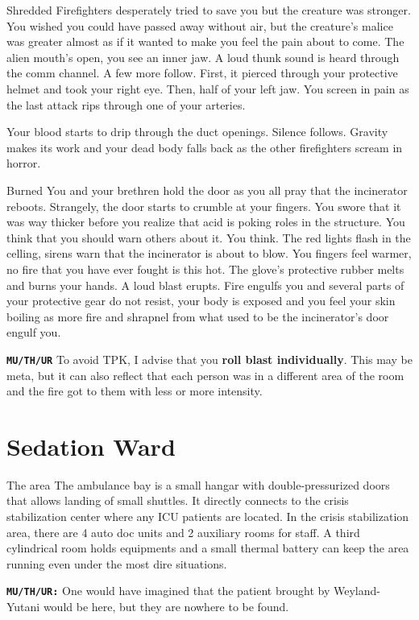 \begin{rpg-warnbox}{Shredded}
   Firefighters desperately tried to save you but the creature was stronger. You wished you could have passed away without air, but the creature's malice was greater almost as if it wanted to make you feel the pain about to come. The alien mouth's open, you see an inner jaw. A loud thunk sound is heard through the comm channel. A few more follow. First, it pierced through your protective helmet and took your right eye. Then, half of your left jaw. You screen in pain as the last attack rips through one of your arteries.
   
   Your blood starts to drip through the duct openings. Silence follows. Gravity makes its work and your dead body falls back as the other firefighters scream in horror.
\end{rpg-warnbox}



\begin{rpg-warnbox}{Burned}
   You and your brethren hold the door as you all pray that the incinerator reboots. Strangely, the door starts to crumble at your fingers. You swore that it was way thicker before you realize that acid is poking roles in the structure. You think that you should warn others about it. You think. The red lights flash in the celling, sirens warn that the incinerator is about to blow. You fingers feel warmer, no fire that you have ever fought is this hot. The glove's protective rubber melts and burns your hands. A loud blast erupts. Fire engulfs you and several parts of your protective gear do not resist, your body is exposed and you feel your skin boiling as more fire and shrapnel from what used to be the incinerator's door engulf you. 

   \texttt{\textbf{MU/TH/UR}} To avoid TPK, I advise that you \textbf{roll blast individually}. This may be meta, but it can also reflect that each person was in a different area of the room and the fire got to them with less or more intensity.
\end{rpg-warnbox}

\section{Sedation Ward}


\begin{rpg-commentbox}{The area}
    The ambulance bay is a small hangar with double-pressurized doors that allows landing of small shuttles. 
    It directly connects to the crisis stabilization center where any ICU patients are located. In the crisis stabilization area, there are 4 auto doc units and 2 auxiliary rooms for staff. A third 
    cylindrical room holds equipments and a small thermal battery can keep the area running even under the most dire situations.
    
    \texttt{\textbf{MU/TH/UR:}} One would have imagined that the patient brought by Weyland-Yutani would be here, but they are nowhere to be found.
\end{rpg-commentbox}  

